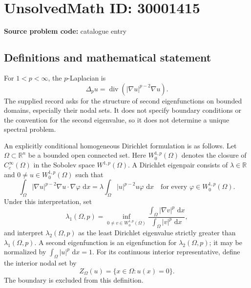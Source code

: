 \documentclass[11pt]{article}
\newcommand{\R}{\mathbb{R}}
\newcommand{\dd}{\,\mathrm{d}}
\begin{document}
\section*{UnsolvedMath ID: 30001415}
\textbf{Source problem code:} catalogue entry
\subsection{Definitions and mathematical statement}
For \(1<p<\infty\), the \(p\)-Laplacian is
\[
\Delta_p u=\operatorname{div}(|\nabla u|^{p-2}\nabla u).
\]
The supplied record asks for the structure of second eigenfunctions on bounded domains, especially their nodal sets. It does not specify boundary conditions or the convention for the second eigenvalue, so it does not determine a unique spectral problem.

An explicitly conditional homogeneous Dirichlet formulation is as follows. Let \(\Omega\subset\R^n\) be a bounded open connected set. Here \(W_0^{1,p}(\Omega)\) denotes the closure of \(C_c^\infty(\Omega)\) in the Sobolev space \(W^{1,p}(\Omega)\). A Dirichlet eigenpair consists of \(\lambda\in\R\) and \(0\ne u\in W_0^{1,p}(\Omega)\) such that
\[
\int_\Omega |\nabla u|^{p-2}\nabla u\cdot\nabla\varphi\,\dd x
=\lambda\int_\Omega |u|^{p-2}u\varphi\,\dd x
\quad\text{for every }\varphi\in W_0^{1,p}(\Omega).
\]
Under this interpretation, set
\[
\lambda_1(\Omega,p)=\inf_{0\ne v\in W_0^{1,p}(\Omega)}
\frac{\int_\Omega |\nabla v|^p\,\dd x}{\int_\Omega |v|^p\,\dd x},
\]
and interpret \(\lambda_2(\Omega,p)\) as the least Dirichlet eigenvalue strictly greater than \(\lambda_1(\Omega,p)\). A second eigenfunction is an eigenfunction for \(\lambda_2(\Omega,p)\); it may be normalized by \(\int_\Omega |u|^p\,\dd x=1\). For its continuous interior representative, define the interior nodal set by
\[
Z_\Omega(u)=\{x\in\Omega:u(x)=0\}.
\]
The boundary is excluded from this definition.
\end{document}
